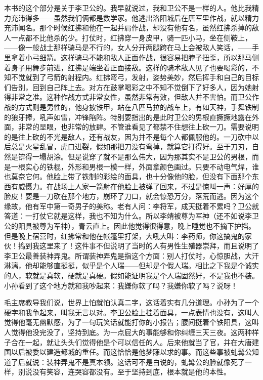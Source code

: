 本书的这个部分是关于李卫公的。我早就说过，我和卫公不是一样的人。他比我精力充沛得多——虽然我们俩都是数学家。他逃出洛阳城后在唐军里作战，就以精力充沛闻名。那个时候红拂和他在一起并肩作战，却没有他有名，虽然红拂杀掉的敌人一点都不比他杀的少。打仗时，红拂穿一身皮甲，骑一匹小马，坐在侧鞍上，——像一般战士那样骑马是不行的，女人分开两腿跨在马上会被敌人笑话，——手里拿着小弓细箭。这样骑马不能和敌人正面作战，很容易把脖子扭歪，所以那马侧着身子用舞步前进，红拂是端坐着正面接敌。这样的骑术敌人见了也要喝彩的，不知不觉就到了弓箭的射程内。红拂弯弓，发射，姿势美妙，然后挥手和自己的目标们告别，回到自己阵上去。对方在鼓掌喝彩之中不知不觉倒下了好多人，因为她射得非常之准。这种作战方式非常女性，虽然非常有效，但敌人并不害怕。而卫公作战的方式则是男性的，他身披铁甲，站在八匹马拉的战车上，有如天神，手舞铁制的狼牙捧，吼声如雷，冲锋陷阵。特别要指出的是此时卫公的男根直撅撅地露在外面，非常的显眼，也非常的放肆。不管谁看见了都禁不住想往上砍一刀。需要说明的是往上砍的不光是敌人，还有战友，因为并不是每个人都佩服他的。一刀砍中以后总是火星乱冒，虎口进裂，假如那把刀没有弯掉，就算它打得好。至于刀刃，自然是锛得一塌胡涂。但是说穿了就不是那么伟大，因为那其实不是卫公的男根，而是一根实心的铁棍，外形和男根一模一样，外面拿颜色画过。只要不动电气焊，谁也莫奈它何。他脸上带了铁制的彩绘的面具，也十分像他的脸，但没有下面那个东西有威慑力。在战场上人家一箭射在他脸上被弹了回来，不过是惊叫一声：好厚的脸皮！要是一刀砍在那个地方，崩环了刀口，就会惊恐万分，落荒而逃。因为这个缘故，他有军中第一奇男子的美称。老有人问：李将军，成天挺着不累吗？卫公就答道：一打仗它就是这样，我也不知为什么。所以李靖被尊为军神（还不如说李卫公的阳具被尊为军神），青云直上。因此他觉得很得意，晚上睡觉也不摘下护挡。但是晚上宿营时，红拂常和他在帐篷里打架，大吼大叫：李药师，你这搞鬼的家伙！捣到我这里来了！这件事不但说明了当时的人有男性生殖器崇拜，而且说明了李卫公最善装神弄鬼。所谓装神弄鬼是指这个方面：别人打仗时，心惊胆战，大汗淋漓，他却能够直挺挺，似乎是个人瑞——但却是个假人瑞。相比之下我是个诚实的人，软就是真软，硬就是真硬。假如能证明我是个人瑞固然好，不是我也不装。小孙看到了这个地方就和我吵起来：我嫌你软了吗？我嫌你软了吗？说呀！ 

毛主席教导我们说，世界上怕就怕认真二字，这话着实有几分道理。小孙为了一个硬字和我争起来，叫我无言以对。李卫公脸上挂着面具，一点表情也没有，这叫人觉得他毫无幽默感，为了一句玩笑话就能打你的小报告；腰间挺着个铁阳具，这叫人觉得他没完没了，坚持到底。为一点屁大的事能够和你纠缠三天三夜。这两种样子合在一起，就让头头们觉得他是个可以信任的人。后来他就当了官，并在大唐建国以后被委以建造都城的重任。而这恰恰是他梦寐以求的事。而这些事被虬髯公知道了后就说：装神弄鬼不是真本领。这话可不是白说的，虬髯公的脸就像死了一样，别说没有笑容，连哭容都没有。至于坚持到底，根本就是他的本性。 

